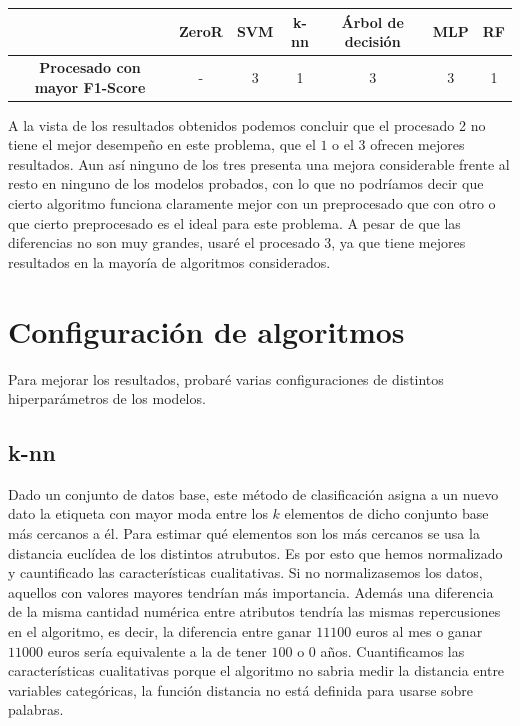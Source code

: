 \documentclass[a4]{article}
\begin{document}
\begin{center}
\begin{tabular}{|c|c|c|c|c|c|c|}
\hline
\multicolumn{1}{|c|}{} & \textbf{ZeroR} & \textbf{SVM} & \textbf{k-nn} & \textbf{Árbol de decisión}  & \textbf{MLP}  & \textbf{RF}   \\ \hline
  \textbf{Procesado con mayor F1-Score} & - & 3 & 1 & 3 & 3 & 1 \\ \hline
\end{tabular}
\end{center}

\vspace{5mm}

A la vista de los resultados obtenidos podemos concluir que el procesado 2 no tiene el mejor desempeño en este problema, que el $1$ o el $3$ ofrecen mejores resultados. Aun así ninguno de los tres presenta una mejora considerable frente al resto en ninguno de los modelos probados, con lo que no podríamos decir que cierto algoritmo funciona claramente mejor con un preprocesado que con otro o que cierto preprocesado es el ideal para este problema. A pesar de que las diferencias no son muy grandes, usaré el  procesado $3$, ya que tiene mejores resultados en la mayoría de algoritmos considerados.

\newpage

\section{Configuración de algoritmos}

Para mejorar los resultados, probaré varias configuraciones de distintos hiperparámetros de los modelos.

\subsection{k-nn}

Dado un conjunto de datos base, este método de clasificación asigna a un nuevo dato la etiqueta con mayor moda entre los $k$ elementos de dicho conjunto base más cercanos a él. Para estimar qué elementos son los más cercanos se usa la distancia euclídea de los distintos atrubutos. Es por esto que hemos normalizado y cauntificado las características cualitativas. Si no normalizasemos los datos, aquellos con valores mayores tendrían más importancia. Además una diferencia de la misma cantidad numérica entre atributos tendría las mismas repercusiones en el algoritmo, es decir, la diferencia entre ganar $11100$ euros al mes o ganar $11000$ euros sería equivalente a la de tener $100$ o $0$ años.  Cuantificamos las características cualitativas porque el algoritmo no sabria medir la distancia entre variables categóricas, la función distancia no está definida para usarse sobre palabras. 
\end{document}
